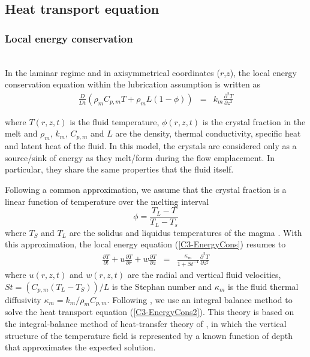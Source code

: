 \subsection{Heat transport equation}

\subsubsection{Local energy conservation}\\

In the laminar regime and in axisymmetrical coordinates ($r$,$z$), the
local energy  conservation equation within the  lubrication assumption
is written as
\begin{eqnarray}
  \frac{D}{D t}\left(\rho_m C_{p,m} T+\rho_mL(1-\phi)\right)&=& k_m  \frac{\partial^2
                                                                T}{\partial
                                                                z^2}
\label{C3-EnergyCons}
\end{eqnarray}

where  $T(r,z,t)$  is  the  fluid temperature,  $\phi(r,z,t)$  is  the
crystal fraction  in the melt  and $\rho_m$, $k_m$, $C_{p,m}$  and $L$
are the density,  thermal conductivity, specific heat  and latent heat
of the  fluid.  In this model,  the crystals are considered  only as a
source/sink of energy  as they melt/form during  the flow emplacement.
In particular, they share the same properties that the fluid itself.

Following a common approximation, we  assume that the crystal fraction
is a linear function of temperature over the melting interval
\begin{equation}
  \phi = \frac{T_L-T}{T_L-T_s}
  \label{C3-meltfraction}
\end{equation}
where $T_S$ and $T_L$ are the solidus and liquidus temperatures of the
magma  \citep{Hort:1997hk,Michaut:2006di}.   With this  approximation,
the local energy equation (\ref{C3-EnergyCons}) resumes to
\begin{eqnarray}
  \frac{\partial T}{\partial t}+ u\frac{\partial T}{\partial r}
  + w\frac{\partial T}{\partial z}  &=& \frac{ \kappa_m}{1+St^{-1}}  \frac{\partial^2
                                        T}{\partial               z^2}
                                        \label{C3-EnergyCons2}
\end{eqnarray}
where  $u(r,z,t)$ and  $w(r,z,t)$ are  the radial  and vertical  fluid
velocities,  $St  =\left(C_{p,m}(T_L-T_S)\right)/L$   is  the  Stephan
number   and    $\kappa_m$   is   the   fluid    thermal   diffusivity
$\kappa_m = k_m/\rho_m  C_{p,m}$.  Following \citet{BALMFORTH:2004fm},
we use an integral balance method to solve the heat transport equation
(\ref{C3-EnergyCons2}).   This theory  is based  on the  integral-balance
method of heat-transfer theory of \citet{Goodman:1958ue}, in which the
vertical structure of the temperature  field is represented by a known
function of depth that approximates the expected solution.

